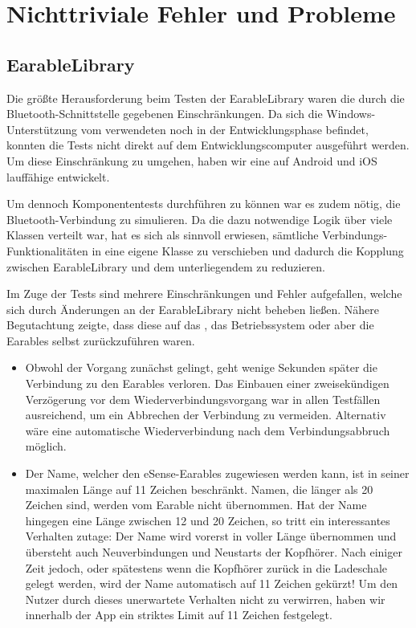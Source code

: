 \documentclass[../validierung.tex]{subfiles}
\begin{document}
\section{Nichttriviale Fehler und Probleme}
	\subsection{EarableLibrary}
		Die größte Herausforderung beim Testen der EarableLibrary waren die durch die Bluetooth-Schnittstelle gegebenen Einschränkungen.
		Da sich die Windows-Unterstützung vom verwendeten  noch in der Entwicklungsphase befindet,
		konnten die Tests nicht direkt auf dem Entwicklungscomputer ausgeführt werden.
		Um diese Einschränkung zu umgehen, haben wir eine auf Android und iOS lauffähige  entwickelt.

		Um dennoch Komponententests durchführen zu können war es zudem nötig, die Bluetooth-Verbindung zu simulieren.
		Da die dazu notwendige Logik über viele Klassen verteilt war, hat es sich als sinnvoll erwiesen, sämtliche Verbindungs-Funktionalitäten in eine
		eigene Klasse  zu verschieben und dadurch die Kopplung zwischen EarableLibrary und dem unterliegendem
		 zu reduzieren.

		Im Zuge der Tests sind mehrere Einschränkungen und Fehler aufgefallen, welche sich durch Änderungen an der EarableLibrary nicht beheben ließen.
		Nähere Begutachtung zeigte, dass diese auf das , das Betriebssystem oder aber die Earables selbst zurückzuführen waren.

		\begin{itemize}
			\item {}
			Obwohl der Vorgang
			zunächst gelingt, geht wenige Sekunden später die Verbindung zu den Earables verloren. Das Einbauen einer zweisekündigen Verzögerung vor dem
			Wiederverbindungsvorgang war in allen Testfällen ausreichend, um ein Abbrechen der Verbindung zu vermeiden.
			Alternativ wäre eine automatische Wiederverbindung nach dem Verbindungsabbruch möglich.
			\item Der Name, welcher den eSense-Earables zugewiesen werden kann, ist in seiner maximalen Länge auf 11 Zeichen beschränkt. Namen, die länger
			als 20 Zeichen sind, werden vom Earable nicht übernommen. Hat der Name hingegen eine Länge zwischen 12 und 20 Zeichen, so tritt ein
			interessantes Verhalten zutage: Der Name wird vorerst in voller Länge übernommen und übersteht auch Neuverbindungen und Neustarts der
			Kopfhörer. Nach einiger Zeit jedoch, oder spätestens wenn die Kopfhörer zurück in die Ladeschale gelegt werden, wird der Name automatisch auf
			11 Zeichen gekürzt!
			Um den Nutzer durch dieses unerwartete Verhalten nicht zu verwirren, haben wir innerhalb der App ein striktes Limit auf 11 Zeichen festgelegt.
		\end{itemize}
\end{document}
